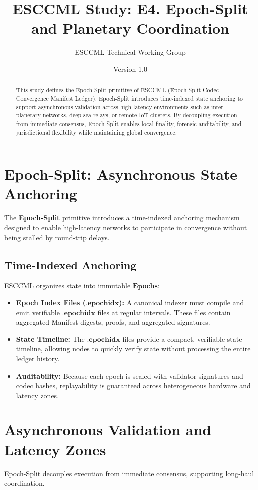 \documentclass[11pt, a4paper]{article}
\title{\textbf{ESCCML Study: E4. Epoch-Split and Planetary Coordination}}
\author{ESCCML Technical Working Group}
\date{Version 1.0}
\begin{document}
\maketitle

\begin{abstract}
This study defines the Epoch-Split primitive of ESCCML (Epoch-Split Codec Convergence Manifest Ledger).
Epoch-Split introduces time-indexed state anchoring to support asynchronous validation across
high-latency environments such as inter-planetary networks, deep-sea relays, or remote IoT clusters.
By decoupling execution from immediate consensus, Epoch-Split enables local finality, forensic
auditability, and jurisdictional flexibility while maintaining global convergence.
\end{abstract}

\section{Epoch-Split: Asynchronous State Anchoring}
The \textbf{Epoch-Split} primitive introduces a time-indexed anchoring mechanism designed to
enable high-latency networks to participate in convergence without being stalled by round-trip delays.

\subsection{Time-Indexed Anchoring}
ESCCML organizes state into immutable $\mathbf{Epochs}$:
\begin{itemize}
    \item \textbf{Epoch Index Files ($\mathbf{.epochidx}$):} A canonical indexer must compile and emit verifiable $\mathbf{.epochidx}$ files at regular intervals. These files contain aggregated Manifest digests, proofs, and aggregated signatures.
    \item \textbf{State Timeline:} The $\mathbf{.epochidx}$ files provide a compact, verifiable state timeline, allowing nodes to quickly verify state without processing the entire ledger history.
    \item \textbf{Auditability:} Because each epoch is sealed with validator signatures and codec hashes, replayability is guaranteed across heterogeneous hardware and latency zones.
\end{itemize}

\section{Asynchronous Validation and Latency Zones}
Epoch-Split decouples execution from immediate consensus, supporting long-haul coordination.
\end{document}
